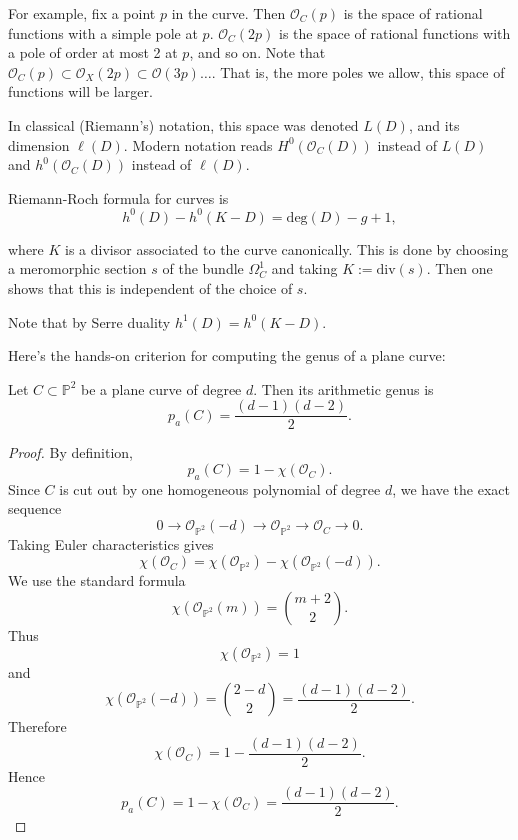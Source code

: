 For example, fix a point $p$ in the curve.
Then $\mathcal{O}_C(p)$ is the space
of rational functions with a simple pole at
$p$.
$\mathcal{O}_C(2p)$ is the space of rational
functions
with a pole of order at most 2 at $p$, and so
on.
Note that $\mathcal{O}_C(p) \subset
\mathcal{O}_X (2p)
\subset \mathcal{O}(3p)…$.
That is, the more poles we allow, this space
of functions will be larger.

In classical (Riemann's) notation, this space
was denoted
$L(D)$, and its dimension $\ell(D)$.
Modern notation reads $H^0(\mathcal{O}_C(D))$
instead of $L(D)$ and
$h^0(\mathcal{O}_C(D))$
instead of $\ell(D)$.

Riemann-Roch formula for curves is
\begin{equation}
\label{equation-riemann-roch-curves}
h^0(D)-h^0(K-D)=\text{deg}(D)-g+1,
\end{equation}

\noindent
where $K$ is a divisor associated to the
curve canonically.
This is done by choosing a meromorphic
section $s$
of the bundle $\Omega_C^1$
and taking $K:=\text{div}(s)$.
Then one shows that this is independent of
the choice of $s$.

Note that by Serre duality
$h^1(D)=h^0(K-D)$.

\medskip\noindent
Here's the hands-on criterion for
computing the genus of a plane curve:

\begin{proposition}
\label{proposition-plane-genus}
Let $C\subset \mathbb P^2$ be a plane
curve of degree $d$. Then its arithmetic
genus is
$$
  p_a(C)=\frac{(d-1)(d-2)}{2}.
$$
\end{proposition}

\begin{proof}
By definition,
$$
  p_a(C)=1-\chi(\mathcal O_C).
$$
Since $C$ is cut out by one homogeneous
polynomial of degree $d$, we have the
exact sequence
$$
  0
  \to
  \mathcal O_{\mathbb P^2}(-d)
  \to
  \mathcal O_{\mathbb P^2}
  \to
  \mathcal O_C
  \to
  0.
$$
Taking Euler characteristics gives
$$
  \chi(\mathcal O_C)
  =
  \chi(\mathcal O_{\mathbb P^2})
  -
  \chi(\mathcal O_{\mathbb P^2}(-d)).
$$
We use the standard formula
$$
  \chi(\mathcal O_{\mathbb P^2}(m))
  =
  \binom{m+2}{2}.
$$
Thus
$$
  \chi(\mathcal O_{\mathbb P^2})=1
$$
and
$$
  \chi(\mathcal O_{\mathbb P^2}(-d))
  =
  \binom{2-d}{2}
  =
  \frac{(d-1)(d-2)}{2}.
$$
Therefore
$$
  \chi(\mathcal O_C)
  =
  1-\frac{(d-1)(d-2)}{2}.
$$
Hence
$$
  p_a(C)
  =
  1-\chi(\mathcal O_C)
  =
  \frac{(d-1)(d-2)}{2}.
$$
\end{proof}

